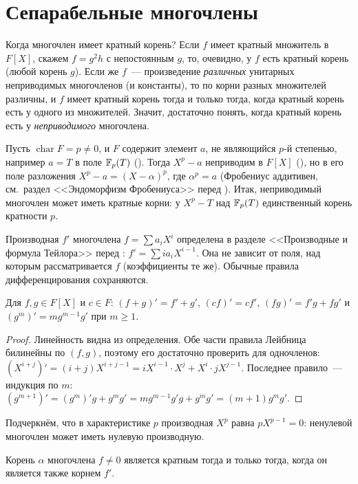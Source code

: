 \section{Сепарабельные многочлены}

Когда многочлен имеет кратный корень? Если $f$ имеет кратный множитель в $F[X]$, скажем $f=g^2h$ с непостоянным $g$, то,
очевидно, у $f$ есть кратный корень (любой корень $g$). Если же $f$~--- произведение \emph{различных} унитарных
неприводимых многочленов (и константы), то по  корни разных множителей различны, и $f$ имеет кратный корень
тогда и только тогда, когда кратный корень есть у одного из множителей. Значит, достаточно понять, когда кратный корень
есть у \emph{неприводимого} многочлена.

\begin{example}[2.18]
Пусть $\operatorname{char}F=p\ne0$, и $F$ содержит элемент $a$, не являющийся $p$-й степенью, например $a=T$ в поле
$\mathbb F_p(T)$ (). Тогда $X^p-a$ неприводим в $F[X]$ (), но в его поле разложения $X^p-a=(X-\alpha)^p$, где
$\alpha^p=a$ (Фробениус аддитивен, см.\ раздел <<Эндоморфизм Фробениуса>> перед ). Итак, неприводимый многочлен
может иметь кратные корни: у $X^p-T$ над $\mathbb F_p(T)$ единственный корень кратности $p$.
\end{example}

Производная $f'$ многочлена $f=\sum a_iX^i$ определена в разделе <<Производные и формула Тейлора>> перед :
$f'=\sum ia_iX^{i-1}$. Она не зависит от поля, над которым рассматривается $f$ (коэффициенты те же). Обычные правила
дифференцирования сохраняются.

\begin{lemma}[2.18a]
Для $f,g\in F[X]$ и $c\in F$: $(f+g)'=f'+g'$, $(cf)'=cf'$, $(fg)'=f'g+fg'$ и $(g^m)'=mg^{m-1}g'$ при $m\ge1$.
\end{lemma}

\begin{proof}
Линейность видна из определения. Обе части правила Лейбница билинейны по $(f,g)$, поэтому его достаточно проверить для
одночленов: $(X^{i+j})'=(i+j)X^{i+j-1}=iX^{i-1}\cdot X^j+X^i\cdot jX^{j-1}$. Последнее правило~--- индукция по $m$:
$(g^{m+1})'=(g^m)'g+g^mg'=mg^{m-1}g'g+g^mg'=(m+1)g^mg'$.
\end{proof}

Подчеркнём, что в характеристике $p$ производная $X^p$ равна $pX^{p-1}=0$: ненулевой многочлен может иметь нулевую
производную.

\begin{lemma}[2.19]
Корень $\alpha$ многочлена $f\ne0$ является кратным тогда и только тогда, когда он является также корнем $f'$.
\end{lemma}

